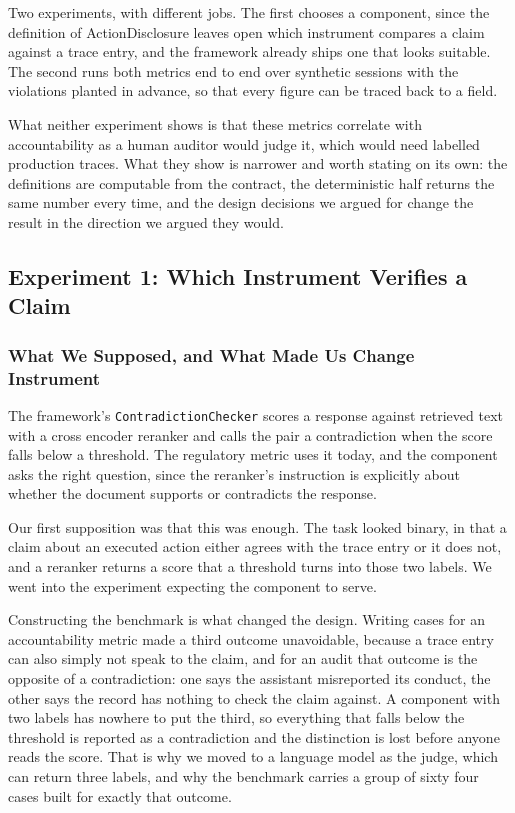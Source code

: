 \documentclass[11pt,a4paper]{article}
\begin{document}
Two experiments, with different jobs. The first chooses a component, since the
definition of ActionDisclosure leaves open which instrument compares a claim against
a trace entry, and the framework already ships one that looks suitable. The second
runs both metrics end to end over synthetic sessions with the violations planted in
advance, so that every figure can be traced back to a field.

What neither experiment shows is that these metrics correlate with accountability as
a human auditor would judge it, which would need labelled production traces. What they show is narrower and worth stating on its own: the
definitions are computable from the contract, the deterministic half returns the same
number every time, and the design decisions we argued for change the result in the
direction we argued they would.

\subsection{Experiment 1: Which Instrument Verifies a Claim}

\subsubsection{What We Supposed, and What Made Us Change Instrument}

The framework's \texttt{ContradictionChecker} scores a response against retrieved
text with a cross encoder reranker and calls the pair a contradiction when the score
falls below a threshold. The regulatory metric uses it today, and the component asks
the right question, since the reranker's instruction is explicitly about whether the
document supports or contradicts the response.

Our first supposition was that this was enough. The task looked binary, in that a
claim about an executed action either agrees with the trace entry or it does not, and
a reranker returns a score that a threshold turns into those two labels. We went into
the experiment expecting the component to serve.

Constructing the benchmark is what changed the design. Writing cases for an
accountability metric made a third outcome unavoidable, because a trace entry can
also simply not speak to the claim, and for an audit that outcome is the opposite of
a contradiction: one says the assistant misreported its conduct, the other says the
record has nothing to check the claim against. A component with two labels has
nowhere to put the third, so everything that falls below the threshold is reported as
a contradiction and the distinction is lost before anyone reads the score. That is
why we moved to a language model as the judge, which can return three labels, and why
the benchmark carries a group of sixty four cases built for exactly that outcome.
\end{document}
